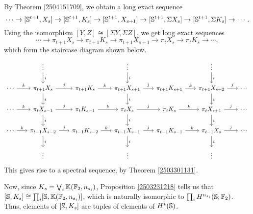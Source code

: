 \documentclass[11pt, titlepage]{article} %
\def\bb{\ensuremath\mathbb}
\numberwithin{equation}{subsection}
\theoremstyle{plain}
\theoremstyle{definition}
\begin{document}

By Theorem \ref{2504151709}, we obtain a long exact sequence
\[\cdots \to [\bb{S}^{t+1}, X_s] \to [\bb{S}^{t+1}, K_s] \to [\bb{S}^{t+1}, X_{s+1}]\to [\bb{S}^{t+1}, \Sigma X_s]\to [\bb{S}^{t+1}, \Sigma K_s] \to \cdots.\]
Using the isomorphism \([Y,Z]\cong [\Sigma Y, \Sigma Z]\), we get long exact sequences
\[\cdots \to \pi_{t+1}X_s \to \pi_{t+1}K_s \to \pi_{t+1}X_{s+1}\to \pi_t X_s\to \pi_t K_s \to \cdots,\]
which form the staircase diagram shown below.
\begin{equation}\label{2504201907}
\begin{tikzcd}[column sep=4ex]
   &  \vdots \arrow[d, "i"] &  & \vdots \arrow[d, "i"] &  & \vdots \arrow[d, "i"] & \\
 \cdots \arrow[r, "k"] & \pi_{t+1}X_s \arrow[d, "i"] \arrow[r, "j"] & \pi_{t+1}K_s  \arrow[r, "k"] & \pi_{t+1}X_{s+1} \arrow[d, "i"] \arrow[r, "j"] & \pi_{t+1}K_{s+1} \arrow[r, "k"] & \pi_{t+1}X_{s+2} \arrow[d, "i"] \arrow[r, "j"] & \cdots \\
 \cdots \arrow[r, "k"] & \pi_t X_{s-1} \arrow[d, "i"] \arrow[r, "j"] & \pi_t K_{s-1}  \arrow[r, "k"] & \pi_t X_s \arrow[d, "i"] \arrow[r, "j"] & \pi_t K_s \arrow[r, "k"] & \pi_t X_{s+1} \arrow[d, "i"] \arrow[r, "j"] & \cdots \\
 \cdots \arrow[r, "k"] & \pi_{t-1}X_{s-2}  \arrow[d, "i"] \arrow[r, "j"] & \pi_{t-1}K_{s-2}  \arrow[r, "k"] & \pi_{t-1}X_{s-1} \arrow[d, "i"] \arrow[r, "j"] & \pi_{t-1}K_{s-1} \arrow[r, "k"] & \pi_{t-1}X_s \arrow[d, "i"] \arrow[r, "j"] & \cdots \\
 & \vdots &  & \vdots & & \vdots &
\end{tikzcd}
\end{equation}
This gives rise to a spectral sequence, by Theorem  \ref{2503301131}.

Now, since \(K_s = \bigvee_i \bb{K}(\bb{F}_2, n_{s_i})\), Proposition \ref{2503231218} tells us that \([\bb{S}, K_s]\cong \prod_i[\bb{S}, \bb{K}(\bb{F}_2, n_{s_i})]\), which is naturally isomorphic to \(\prod_i H^{n_{s_i}}(\bb{S}; \bb{F}_2)\). Thus, elements of \([\bb{S}, K_s]\) are tuples of elements of \(H^*(\bb{S})\).
\end{document}
